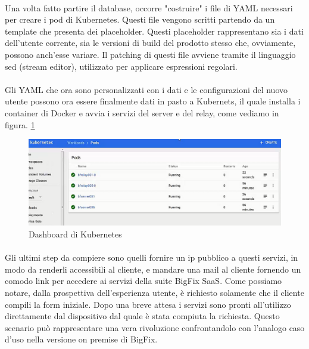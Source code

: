 \paragraph{}
Una volta fatto partire il database, occorre "costruire" i file di YAML necessari per creare i pod di Kubernetes. Questi file vengono scritti partendo da un template che presenta dei placeholder. Questi placeholder rappresentano sia i dati dell'utente corrente, sia le versioni di build del prodotto stesso che, ovviamente, possono anch'esse variare. Il patching di questi file avviene tramite il linguaggio sed (stream editor), utilizzato per applicare espressioni regolari.
\paragraph{}
Gli YAML che ora sono personalizzati con i dati e le configurazioni del nuovo utente possono ora essere finalmente dati in pasto a Kubernets, il quale installa i container di Docker e avvia i servizi del server e del relay, come vediamo in figura. \ref{fig:kubedashboard}
\begin{figure}[h]
	\centering
	\includegraphics[width=0.7\linewidth]{capitoli/imgs/kubedashboard}
	\caption{Dashboard di Kubernetes}
	\label{fig:kubedashboard}
\end{figure}
\paragraph{}
Gli ultimi step da compiere sono quelli fornire un ip pubblico a questi servizi, in modo da renderli accessibili al cliente, e mandare una mail al cliente fornendo un comodo link per accedere ai servizi della suite BigFix SaaS. Come possiamo notare, dalla prospettiva dell'esperienza utente, è richiesto solamente che il cliente compili la form iniziale. Dopo una breve attesa i servizi sono pronti all'utilizzo direttamente dal dispositivo dal quale è stata compiuta la richiesta. Questo scenario può rappresentare una vera rivoluzione confrontandolo con l'analogo caso d'uso nella versione on premise di BigFix.
 

